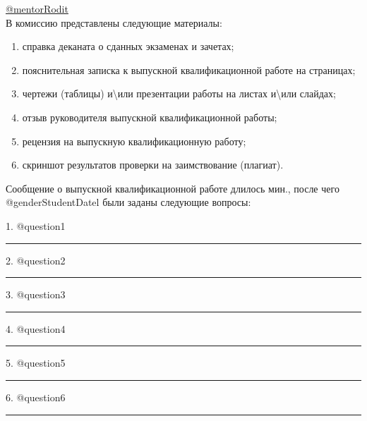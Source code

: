\documentclass[a4paper,12pt]{article} %
\begin{document}
	
    \hspace{1cm}\underline{@mentorRodit}\\

\hspace{-0.25cm}В комиссию представлены следующие материалы:
\vspace{-0.25cm}
\begin{enumerate}	
	\item  	справка деканата о сданных экзаменах и зачетах;
	\vspace{-0.3cm}
	\item  	пояснительная записка к выпускной квалификационной работе на \makebox[10mm]{\hrulefill} страницах;
	\vspace{-0.3cm}
	\item   чертежи (таблицы) и\textbackslash{}или презентации работы на \makebox[10mm]{\hrulefill}		 листах и\textbackslash{}или 	\makebox[10mm]{\hrulefill}		слайдах;
	\vspace{-0.3cm}
	\item 	отзыв руководителя выпускной квалификационной работы;
	\vspace{-0.3cm}
	\item	рецензия на выпускную квалификационную работу;
	\vspace{-0.3cm}
	\item  	скриншот результатов проверки на заимствование (плагиат).
\end{enumerate}

\hspace{-0.15cm}Сообщение о выпускной квалификационной работе длилось \underline{} мин., после чего\\
 @genderStudentDatel были заданы следующие вопросы:\\
\vspace{-0.5cm} 
\begin{flushleft}
	  	1. @question1
	  	\smallskip\hrule
	  	\vspace{0.2cm} 
	  	2. @question2
	  	\smallskip\hrule
	  	\vspace{0.2cm}
	  	3. @question3
	  	\smallskip\hrule
	  	\vspace{0.2cm} 
	  	4. @question4
	  	\smallskip\hrule
	  	\vspace{0.2cm} 
	  	5. @question5
	  	\smallskip\hrule
	  	\vspace{0.2cm} 
	  	6. @question6
	  	\smallskip\hrule
	  	\vspace{0.2cm} 	 	
	  	
\end{flushleft}
\end{document}
